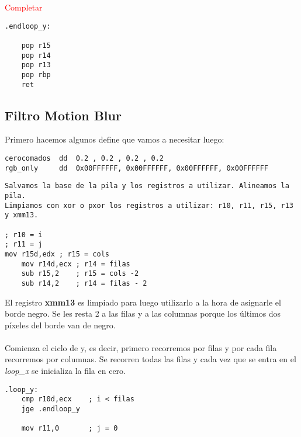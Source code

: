 \documentclass[a4paper]{article}
\begin{document}
\indent \textcolor{red}{Completar}
\begin{codesnippet}
\begin{verbatim}
.endloop_y:

	pop r15
	pop r14
	pop r13
	pop rbp
    ret
\end{verbatim}
\end{codesnippet}




\newpage
\subsection{Filtro Motion Blur}
\indent Primero hacemos algunos define que vamos a necesitar luego:
 \begin{codesnippet}
\begin{verbatim}
cerocomados  dd  0.2 , 0.2 , 0.2 , 0.2
rgb_only     dd  0x00FFFFFF, 0x00FFFFFF, 0x00FFFFFF, 0x00FFFFFF
\end{verbatim}
\end{codesnippet}

 \begin{codesnippet}
\begin{verbatim}
Salvamos la base de la pila y los registros a utilizar. Alineamos la pila.
Limpiamos con xor o pxor los registros a utilizar: r10, r11, r15, r13 y xmm13.

; r10 = i
; r11 = j
mov r15d,edx ; r15 = cols
	mov r14d,ecx ; r14 = filas
	sub r15,2 	 ; r15 = cols -2 
	sub r14,2 	 ; r14 = filas - 2 
\end{verbatim}
\end{codesnippet}

\indent El registro \textbf{xmm13} es limpiado para luego utilizarlo a la hora de asignarle el borde negro. Se les resta 2 a las filas y a las columnas porque los \'ultimos dos p\'ixeles del borde van de negro.\\
\\
\indent Comienza el ciclo de y, es decir, primero recorremos por filas y por cada fila recorremos por columnas. Se recorren todas las filas y cada vez que se entra en el \textit{loop_x} se inicializa la fila en cero.
 \begin{codesnippet}
\begin{verbatim}
.loop_y:
    cmp r10d,ecx 	; i < filas 
    jge .endloop_y
	
    mov r11,0 		; j = 0
\end{verbatim}
\end{codesnippet}
\end{document}
